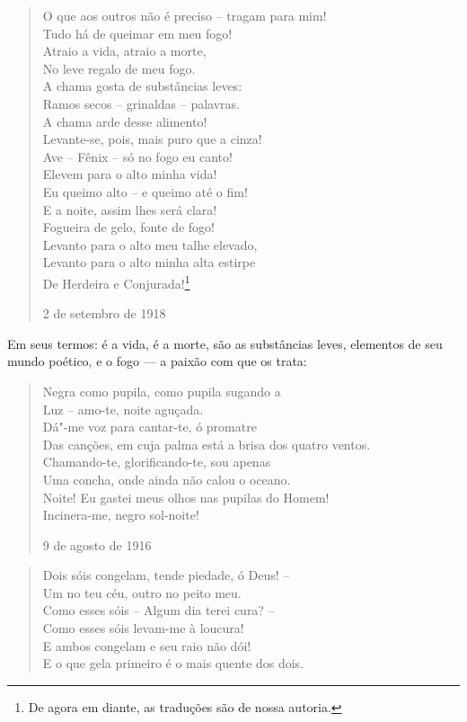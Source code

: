 {\begin{verse}
O que aos outros não é preciso -- tragam \qb{}para mim! \\
Tudo há de queimar em meu fogo! \\
Atraio a vida, atraio a morte, \\
No leve regalo de meu fogo. \\[8pt]
A chama gosta de substâncias leves: \\
Ramos secos -- grinaldas -- palavras. \\
A chama arde desse alimento! \\
Levante-se, pois, mais puro que a cinza! \\[8pt]
Ave -- Fênix -- só no fogo eu canto! \\
Elevem para o alto minha vida! \\
Eu queimo alto -- e queimo até o fim! \\
E a noite, assim lhes será clara! \\[8pt]
Fogueira de gelo, fonte de fogo! \\
Levanto para o alto meu talhe elevado, \\
Levanto para o alto minha alta estirpe \\
De Herdeira e Conjurada!\footnote{De agora em diante, as traduções são
  de nossa autoria.}

2 de setembro de 1918

\end{verse}

Em seus termos: é a vida, é a morte, são as substâncias leves, elementos
de seu mundo poético, e o fogo --- a paixão com que os trata:

\begin{verse}
Negra como pupila, como pupila sugando a \\
Luz -- amo-te, noite aguçada. \\[8pt]
Dá"-me voz para cantar-te, ó promatre \\
Das canções, em cuja palma está a brisa \qb{}dos quatro ventos. \\[8pt]
Chamando-te, glorificando-te, sou apenas \\
Uma concha, onde ainda não calou o oceano. \\[8pt]
Noite! Eu gastei meus olhos nas pupilas \qb{}do Homem! \\
Incinera-me, negro sol-noite!

9 de agosto de 1916
\end{verse}

\begin{verse}
Dois sóis congelam, tende piedade, \qb{}ó Deus! -- \\
Um no teu céu, outro no peito meu. \\[8pt]
Como esses sóis -- Algum dia terei cura? -- \\
Como esses sóis levam-me à loucura! \\[8pt]
E ambos congelam e seu raio não dói! \\
E o que gela primeiro é o mais quente \qb{}dos dois.


\end{verse}}
